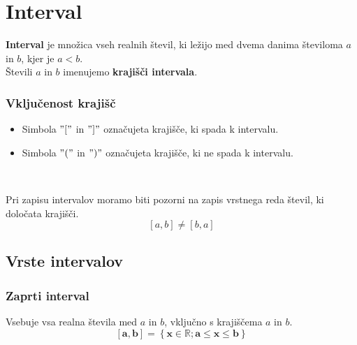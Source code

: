         \newpage
    \section{Interval}

        

            
                \textbf{Interval} je množica vseh realnih števil, ki ležijo med dvema danima številoma $a$ in $b$, kjer je $a<b$. \\
                Števili $a$ in $b$ imenujemo \textbf{krajišči intervala}.                
            
            

            \subsubsection*{Vključenost krajišč}
                \begin{itemize}
                    \item Simbola $"["$ in $"]"$ označujeta krajišče, ki spada k intervalu.
                    \item Simbola $"("$ in $")"$ označujeta krajišče, ki ne spada k intervalu.
                \end{itemize}
            
            
                ~
            
                Pri zapisu intervalov moramo biti pozorni na zapis vrstnega reda števil, ki določata krajišči.
                $$[a,b]\neq[b,a]$$
            
            


        

        
            \subsection{Vrste intervalov}

            \subsubsection*{Zaprti interval}
            Vsebuje vsa realna števila med $a$ in $b$, vključno s krajiščema $a$ in $b$.
            $$ \mathbf{[a,b]=\left\{x\in\mathbb{R}; a\leq x\leq b\right\} }$$

